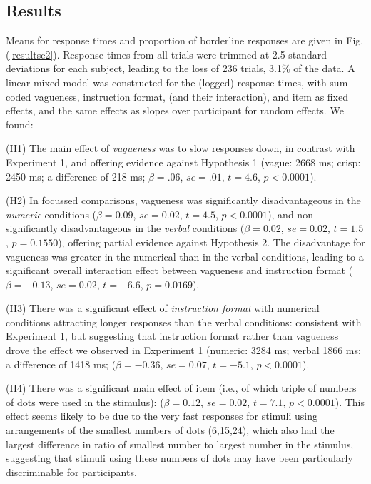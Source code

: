 \documentclass[%
man,		%
floatsintext,%
apacite%
]{apa6} %
\begin{document}
\subsection{Results} %

Means for response times and proportion of borderline responses are given in Fig. (\ref{resultse2}). 
Response times from all trials were trimmed at 2.5 standard deviations for each subject, leading to the loss of 236 trials, 3.1\% of the data. 
A linear mixed model was constructed for the (logged) response times, 
with sum-coded vagueness, instruction format, (and their interaction), and item as fixed effects, and the same effects as slopes over participant for random effects. We found:
{\small
\begin{APAenumerate}
	\item [(H1)] The main effect of \emph{vagueness} was to slow responses down, in contrast with Experiment 1, and offering evidence against Hypothesis 1 (vague: 2668 ms; crisp: 2450 ms; a difference of 218 ms; $\beta=.06$, $se=.01$, $t=4.6$, $p<0.0001$). 
	\item [(H2)] In focussed comparisons, vagueness was significantly disadvantageous in the \emph{numeric} conditions ($\beta=0.09$, $se=0.02$, $t=4.5$, $p<0.0001$), and non-significantly disadvantageous in the \emph{verbal} conditions ($\beta=0.02$, $se=0.02$, $t=1.5$, $p=0.1550$), offering partial evidence against Hypothesis 2. The disadvantage for vagueness was greater in the numerical than in the verbal conditions, leading to a significant overall interaction effect between vagueness and instruction format ($\beta=-0.13$, $se=0.02$, $t=-6.6$, $p=0.0169$).
	\item [(H3)] There was a significant effect of \emph{instruction format} with numerical conditions attracting longer responses than the verbal conditions: consistent with Experiment 1, but suggesting that instruction format rather than vagueness drove the effect we observed in Experiment 1 (numeric: 3284 ms; verbal 1866 ms; a difference of 1418 ms; ($\beta=-0.36$, $se=0.07$, $t=-5.1$, $p<0.0001$).
	\item [(H4)] There was a significant main effect of item (i.e., of which triple of numbers of dots were used in the stimulus): ($\beta=0.12$, $se=0.02$, $t=7.1$, $p<0.0001$). This effect seems likely to be due to the very fast responses for stimuli using arrangements of the smallest numbers of dots (6,15,24), which also had the largest difference in ratio of smallest number to largest number in the stimulus, suggesting that stimuli using these numbers of dots may have been particularly discriminable for participants.
\end{APAenumerate}
}
\end{document}
